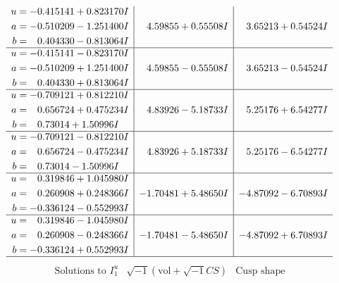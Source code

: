 \documentclass[1p]{elsarticle_modified}
\theoremstyle{definition}
\newcommand{\I}{\sqrt{-1}}
\begin{document}
$$\begin{array}{c|c|c}
\begin{aligned}
u &= -0.415141 + 0.823170 I \\
a &= -0.510209 - 1.251400 I \\
b &= \phantom{-}0.404330 - 0.813064 I\end{aligned}
 & \phantom{-}4.59855 + 0.55508 I & \phantom{-}3.65213 + 0.54524 I \\ \hline\begin{aligned}
u &= -0.415141 - 0.823170 I \\
a &= -0.510209 + 1.251400 I \\
b &= \phantom{-}0.404330 + 0.813064 I\end{aligned}
 & \phantom{-}4.59855 - 0.55508 I & \phantom{-}3.65213 - 0.54524 I \\ \hline\begin{aligned}
u &= -0.709121 + 0.812210 I \\
a &= \phantom{-}0.656724 + 0.475234 I \\
b &= \phantom{-}0.73014 + 1.50996 I\end{aligned}
 & \phantom{-}4.83926 - 5.18733 I & \phantom{-}5.25176 + 6.54277 I \\ \hline\begin{aligned}
u &= -0.709121 - 0.812210 I \\
a &= \phantom{-}0.656724 - 0.475234 I \\
b &= \phantom{-}0.73014 - 1.50996 I\end{aligned}
 & \phantom{-}4.83926 + 5.18733 I & \phantom{-}5.25176 - 6.54277 I \\ \hline\begin{aligned}
u &= \phantom{-}0.319846 + 1.045980 I \\
a &= \phantom{-}0.260908 + 0.248366 I \\
b &= -0.336124 - 0.552993 I\end{aligned}
 & -1.70481 + 5.48650 I & -4.87092 - 6.70893 I \\ \hline\begin{aligned}
u &= \phantom{-}0.319846 - 1.045980 I \\
a &= \phantom{-}0.260908 - 0.248366 I \\
b &= -0.336124 + 0.552993 I\end{aligned}
 & -1.70481 - 5.48650 I & -4.87092 + 6.70893 I\\
 \hline 
 \end{array}$$\newpage$$\begin{array}{c|c|c}  
\text{Solutions to }I^u_{1}& \I (\text{vol} + \sqrt{-1}CS) & \text{Cusp shape}\\

\end{array}$$
\end{document}
